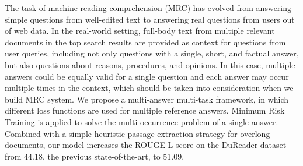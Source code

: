 The task of machine reading comprehension (MRC) has evolved from answering simple questions from well-edited text to answering real questions from users out of web data. In the real-world setting, full-body text from multiple relevant documents in the top search results are provided as context for questions from user queries, including not only questions with a single, short, and factual answer, but also questions about reasons, procedures, and opinions. In this case, multiple answers could be equally valid for a single question and each answer may occur multiple times in the context, which should be taken into consideration when we build MRC system. We propose a multi-answer multi-task framework, in which different loss functions are used for multiple reference answers. Minimum Risk Training is applied to solve the multi-occurrence problem of a single answer. Combined with a simple heuristic passage extraction strategy for overlong documents, our model increases the ROUGE-L score on the DuReader dataset from 44.18, the previous state-of-the-art, to 51.09.
